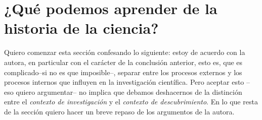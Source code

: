 





\section{¿Qué podemos aprender de la historia de la ciencia?}\label{sub:aprender}


\noindent Quiero comenzar esta sección confesando lo siguiente: estoy de acuerdo con la autora, en particular con el carácter de la conclusión anterior, esto es, que es complicado--si no es que imposible--, separar entre los procesos externos y los procesos internos que influyen en la investigación científica.
Pero aceptar esto --eso quiero argumentar-- no implica que debamos deshacernos de la distinción entre el \emph{contexto de investigación} y el \emph{contexto de descubrimiento}.
En lo que resta de la sección quiero hacer un breve repaso de los argumentos de la autora.

